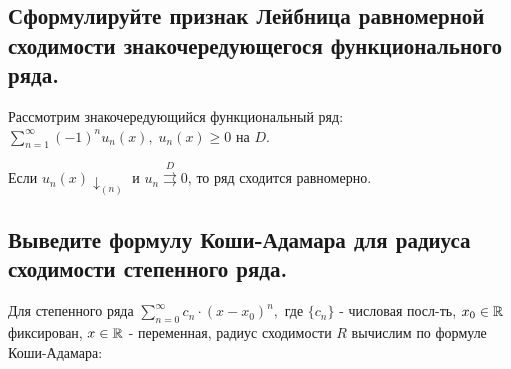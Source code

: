 \documentclass[a4paper, fleqn]{article}
\begin{document}
        
        
        
        
    
    \subsection{Сформулируйте признак Лейбница равномерной сходимости знакочередующегося функционального ряда.}
    
    Рассмотрим знакочередующийся функциональный ряд: $\displaystyle \sum_{n = 1}^{\infty} (-1)^n u_n(x), \; u_n(x) \geq 0$ на $D$.
    
    Если $u_n(x) \downarrow_{(n)}$ и $u_n \stackrel{D}{\rightrightarrows} 0$, то ряд сходится равномерно.
        
        
        
        
        
        
        
        
        
        
    
    \subsection{Выведите формулу Коши-Адамара для радиуса сходимости степенного ряда.}
    
    Для степенного ряда $\displaystyle \sum_{n = 0}^{\infty} c_n \cdot (x - x_0)^n,$ где $\{ c_n \}$ - числовая посл-ть, $x_0 \in \mathbb{R}$ фиксирован,  $x \in \mathbb{R}$ - переменная, радиус сходимости $R$ вычислим по формуле Коши-Адамара:
    
    
\end{document}
